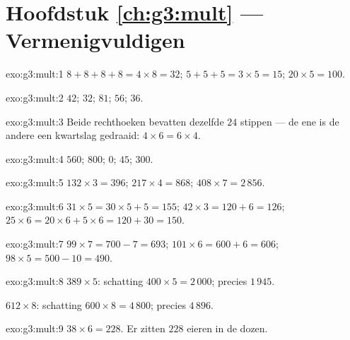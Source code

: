 \section*{Hoofdstuk \ref{ch:g3:mult} --- Vermenigvuldigen}

\begin{solution}{exo:g3:mult:1}
$8 + 8 + 8 + 8 = 4 \times 8 = 32$; \quad
$5 + 5 + 5 = 3 \times 5 = 15$; \quad
$20 \times 5 = 100$.
\end{solution}

\begin{solution}{exo:g3:mult:2}
$42$; \quad $32$; \quad $81$; \quad $56$; \quad $36$.
\end{solution}

\begin{solution}{exo:g3:mult:3}
Beide rechthoeken bevatten dezelfde $24$ stippen --- de ene is de andere
een kwartslag gedraaid: $4 \times 6 = 6 \times 4$.
\end{solution}

\begin{solution}{exo:g3:mult:4}
$560$; \quad $800$; \quad $0$; \quad $45$; \quad $300$.
\end{solution}

\begin{solution}{exo:g3:mult:5}
$132 \times 3 = 396$; \quad
$217 \times 4 = 868$; \quad
$408 \times 7 = 2\,856$.
\end{solution}

\begin{solution}{exo:g3:mult:6}
$31 \times 5 = 30 \times 5 + 5 = 155$; \quad
$42 \times 3 = 120 + 6 = 126$; \quad
$25 \times 6 = 20 \times 6 + 5 \times 6 = 120 + 30 = 150$.
\end{solution}

\begin{solution}{exo:g3:mult:7}
$99 \times 7 = 700 - 7 = 693$; \quad
$101 \times 6 = 600 + 6 = 606$; \quad
$98 \times 5 = 500 - 10 = 490$.
\end{solution}

\begin{solution}{exo:g3:mult:8}
$389 \times 5$: schatting $400 \times 5 = 2\,000$; precies $1\,945$.

$612 \times 8$: schatting $600 \times 8 = 4\,800$; precies $4\,896$.
\end{solution}

\begin{solution}{exo:g3:mult:9}
$38 \times 6 = 228$. Er zitten $228$ eieren in de dozen.
\end{solution}

